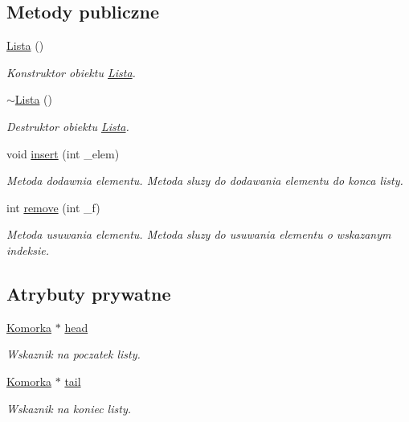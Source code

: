 \subsection*{Metody publiczne}
\begin{DoxyCompactItemize}
\item 
\hyperlink{class_lista_a1f668b36909182ef1360b48503529a31}{Lista} ()
\begin{DoxyCompactList}\small\item\em Konstruktor obiektu \hyperlink{class_lista}{Lista}. \end{DoxyCompactList}\item 
\hyperlink{class_lista_a4d7394b2728a00ad8404965b2e15d096}{$\sim$\-Lista} ()
\begin{DoxyCompactList}\small\item\em Destruktor obiektu \hyperlink{class_lista}{Lista}. \end{DoxyCompactList}\item 
void \hyperlink{class_lista_acec8ac807da644d8250c3c6043a208e1}{insert} (int \-\_\-elem)
\begin{DoxyCompactList}\small\item\em Metoda dodawnia elementu. Metoda sluzy do dodawania elementu do konca listy. \end{DoxyCompactList}\item 
int \hyperlink{class_lista_a18ce18bccb1af9b8d818f103021d7b4a}{remove} (int \-\_\-f)
\begin{DoxyCompactList}\small\item\em Metoda usuwania elementu. Metoda sluzy do usuwania elementu o wskazanym indeksie. \end{DoxyCompactList}\end{DoxyCompactItemize}
\subsection*{Atrybuty prywatne}
\begin{DoxyCompactItemize}
\item 
\hyperlink{struct_lista_1_1_komorka}{Komorka} $\ast$ \hyperlink{class_lista_aeba20505030183d334971bd44c3c8b95}{head}
\begin{DoxyCompactList}\small\item\em Wskaznik na poczatek listy. \end{DoxyCompactList}\item 
\hyperlink{struct_lista_1_1_komorka}{Komorka} $\ast$ \hyperlink{class_lista_a7d42e5f99e945d97c29d6f764f71f4e7}{tail}
\begin{DoxyCompactList}\small\item\em Wskaznik na koniec listy. \end{DoxyCompactList}\end{DoxyCompactItemize}


